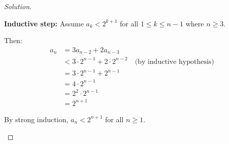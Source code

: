 \documentclass[12pt]{article}
\begin{document}
\begin{proof}[Solution]
\begin{enumerate}[label=(\alph*)]
    \textbf{Inductive step:} Assume $a_k < 2^{k+1}$ for all $1 \leq k \leq n-1$ where $n \geq 3$.
    
    Then:
    \begin{align*}
    a_n &= 3a_{n-2} + 2a_{n-3} \\
    &< 3 \cdot 2^{n-1} + 2 \cdot 2^{n-2} \quad \text{(by inductive hypothesis)} \\
    &= 3 \cdot 2^{n-1} + 2^{n-1} \\
    &= 4 \cdot 2^{n-1} \\
    &= 2^2 \cdot 2^{n-1} \\
    &= 2^{n+1}
    \end{align*}
    
    By strong induction, $a_n < 2^{n+1}$ for all $n \geq 1$.
\end{enumerate}
\end{proof}
\end{document}
